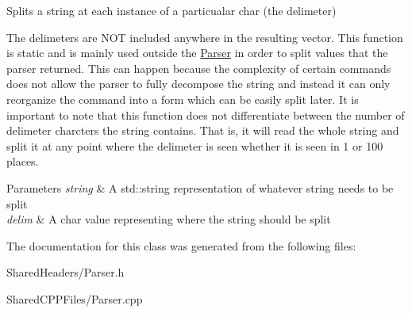 Splits a string at each instance of a particualar char (the delimeter) 

The delimeters are N\+OT included anywhere in the resulting vector. This function is static and is mainly used outside the \mbox{\hyperlink{classParser}{Parser}} in order to split values that the parser returned. This can happen because the complexity of certain commands does not allow the parser to fully decompose the string and instead it can only reorganize the command into a form which can be easily split later. It is important to note that this function does not differentiate between the number of delimeter charcters the string contains. That is, it will read the whole string and split it at any point where the delimeter is seen whether it is seen in 1 or 100 places.


\begin{DoxyParams}{Parameters}
{\em string} & A std\+::string representation of whatever string needs to be split \\
\hline
{\em delim} & A char value representing where the string should be split \\
\hline
\end{DoxyParams}


The documentation for this class was generated from the following files\+:\begin{DoxyCompactItemize}
\item 
Shared\+Headers/Parser.\+h\item 
Shared\+C\+P\+P\+Files/Parser.\+cpp\end{DoxyCompactItemize}
